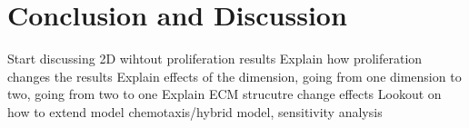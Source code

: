 \section{Conclusion and Discussion}

Start discussing 2D wihtout proliferation results\newline
Explain how proliferation changes the results\newline
Explain effects of the dimension, going from one dimension to two, going from two to one\newline
Explain ECM strucutre change effects\newline
Lookout on how to extend model chemotaxis/hybrid model, sensitivity analysis\newline
